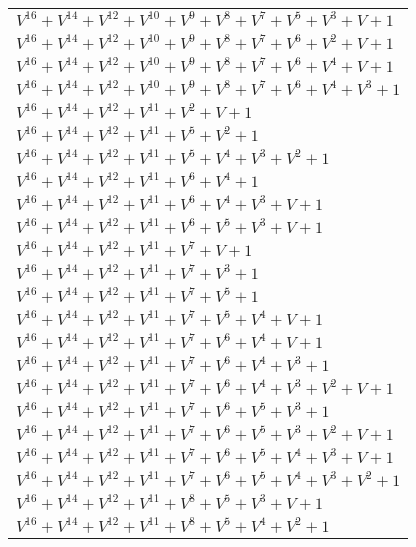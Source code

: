 \documentclass[12pt]{article}
\begin{document}
\begin{adjustwidth}{-4cm}{}
\begin{center}
\begin{longtable}{|l|}
$V^{16}  +V^{14}  +V^{12}  +V^{10}  +V^{9}  +V^{8}  +V^{7}  +V^{5}  +V^{3}  + V + 1$ \\
$V^{16}  +V^{14}  +V^{12}  +V^{10}  +V^{9}  +V^{8}  +V^{7}  +V^{6}  +V^{2}  + V + 1$ \\
$V^{16}  +V^{14}  +V^{12}  +V^{10}  +V^{9}  +V^{8}  +V^{7}  +V^{6}  +V^{4}  + V + 1$ \\
$V^{16}  +V^{14}  +V^{12}  +V^{10}  +V^{9}  +V^{8}  +V^{7}  +V^{6}  +V^{4}  +V^{3}  + 1$ \\
$V^{16}  +V^{14}  +V^{12}  +V^{11}  +V^{2}  + V + 1$ \\
$V^{16}  +V^{14}  +V^{12}  +V^{11}  +V^{5}  +V^{2}  + 1$ \\
$V^{16}  +V^{14}  +V^{12}  +V^{11}  +V^{5}  +V^{4}  +V^{3}  +V^{2}  + 1$ \\
$V^{16}  +V^{14}  +V^{12}  +V^{11}  +V^{6}  +V^{4}  + 1$ \\
$V^{16}  +V^{14}  +V^{12}  +V^{11}  +V^{6}  +V^{4}  +V^{3}  + V + 1$ \\
$V^{16}  +V^{14}  +V^{12}  +V^{11}  +V^{6}  +V^{5}  +V^{3}  + V + 1$ \\
$V^{16}  +V^{14}  +V^{12}  +V^{11}  +V^{7}  + V + 1$ \\
$V^{16}  +V^{14}  +V^{12}  +V^{11}  +V^{7}  +V^{3}  + 1$ \\
$V^{16}  +V^{14}  +V^{12}  +V^{11}  +V^{7}  +V^{5}  + 1$ \\
$V^{16}  +V^{14}  +V^{12}  +V^{11}  +V^{7}  +V^{5}  +V^{4}  + V + 1$ \\
$V^{16}  +V^{14}  +V^{12}  +V^{11}  +V^{7}  +V^{6}  +V^{4}  + V + 1$ \\
$V^{16}  +V^{14}  +V^{12}  +V^{11}  +V^{7}  +V^{6}  +V^{4}  +V^{3}  + 1$ \\
$V^{16}  +V^{14}  +V^{12}  +V^{11}  +V^{7}  +V^{6}  +V^{4}  +V^{3}  +V^{2}  + V + 1$ \\
$V^{16}  +V^{14}  +V^{12}  +V^{11}  +V^{7}  +V^{6}  +V^{5}  +V^{3}  + 1$ \\
$V^{16}  +V^{14}  +V^{12}  +V^{11}  +V^{7}  +V^{6}  +V^{5}  +V^{3}  +V^{2}  + V + 1$ \\
$V^{16}  +V^{14}  +V^{12}  +V^{11}  +V^{7}  +V^{6}  +V^{5}  +V^{4}  +V^{3}  + V + 1$ \\
$V^{16}  +V^{14}  +V^{12}  +V^{11}  +V^{7}  +V^{6}  +V^{5}  +V^{4}  +V^{3}  +V^{2}  + 1$ \\
$V^{16}  +V^{14}  +V^{12}  +V^{11}  +V^{8}  +V^{5}  +V^{3}  + V + 1$ \\
$V^{16}  +V^{14}  +V^{12}  +V^{11}  +V^{8}  +V^{5}  +V^{4}  +V^{2}  + 1$ \\

\end{longtable}
\end{center}
\end{adjustwidth}
\end{document}
